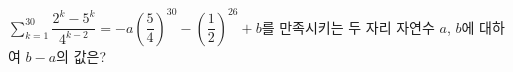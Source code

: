 $\displaystyle\sum_{k=1}^{30} \dfrac{2^k-5^k}{4^{k-2}}=-a\left(\dfrac{5}{4}\right)^{30}-\left(\dfrac{1}{2}\right)^{26}+b$를 만족시키는 두 자리 자연수 $a$, $b$에 대하여 $b-a$의 값은?
